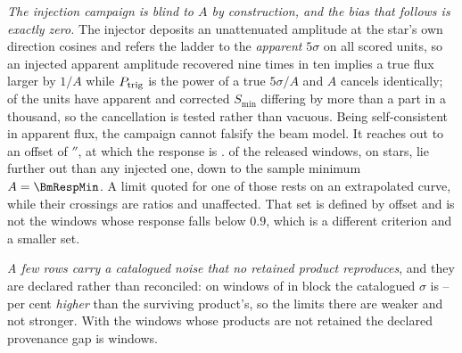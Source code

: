 \emph{The injection campaign is blind to $A$ by construction, and the bias
that follows is exactly zero.} The injector deposits an unattenuated amplitude
at the star's own direction cosines and refers the ladder to the
\emph{apparent} $5\sigma$ on all \PbInjNUnit{} scored units, so an injected
apparent amplitude recovered nine times in ten implies a true flux larger by
$1/A$ while $P_{\rm trig}$ is the power of a true $5\sigma/A$ and $A$ cancels
identically; \PbInjNDistinct{} of the units have apparent and corrected
$S_{\min}$ differing by more than a part in a thousand, so the cancellation
is tested rather than vacuous. Being self-consistent in apparent flux, the
campaign cannot falsify the beam model. It reaches out to an offset of
\PbInjOffMax$''$, at which the response is \PbInjAMin. \PbNBeyond{}
of the \PbNWin{} released windows, on \PbNBeyondStar{} stars, lie further out
than any injected one, down to the sample minimum $A=\BmRespMin$. A limit
quoted for one of those rests on an extrapolated curve, while their
\PbNBeyondCross{} crossings are ratios and unaffected. That set is defined by
offset and is not the \BmNBelowNine{} windows whose response falls below
$0.9$, which is a different criterion and a smaller set.

\emph{A few rows carry a catalogued noise that no retained product
reproduces}, and they are declared rather than reconciled: on \PbGapN{}
windows of \PbGapStar{} in block \texttt{\PbGapEb} the catalogued $\sigma$ is
\PbGapPctLo--\PbGapPctHi{} per cent \emph{higher} than the surviving
product's, so the limits there are weaker and not stronger. With the
\PbGapNoProd{} windows whose products are not retained the declared
provenance gap is \PbGapDeclared{} windows.

